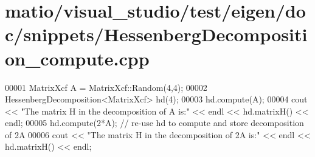 \hypertarget{matio_2visual__studio_2test_2eigen_2doc_2snippets_2_hessenberg_decomposition__compute_8cpp_source}{}\section{matio/visual\+\_\+studio/test/eigen/doc/snippets/\+Hessenberg\+Decomposition\+\_\+compute.cpp}
\label{matio_2visual__studio_2test_2eigen_2doc_2snippets_2_hessenberg_decomposition__compute_8cpp_source}

\begin{DoxyCode}
00001 MatrixXcf A = MatrixXcf::Random(4,4);
00002 HessenbergDecomposition<MatrixXcf> hd(4);
00003 hd.compute(A);
00004 cout << \textcolor{stringliteral}{"The matrix H in the decomposition of A is:"} << endl << hd.matrixH() << endl;
00005 hd.compute(2*A); \textcolor{comment}{// re-use hd to compute and store decomposition of 2A}
00006 cout << \textcolor{stringliteral}{"The matrix H in the decomposition of 2A is:"} << endl << hd.matrixH() << endl;
\end{DoxyCode}

